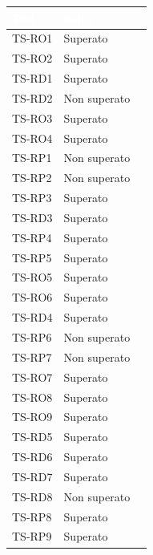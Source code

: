 \begin{longtable}{|>{\centering\arraybackslash}m{1.6cm}|>{\centering\arraybackslash}m{6.41cm}|>{\centering\arraybackslash}m{3.1cm}|}		
	\rowcolor{LightBlue}
	\textbf{\textcolor{white}{Test}}
	& \textbf{\textcolor{white}{Esito}}\\
	\hline
		\rowcolor{LightGray}
		TS-RO1
		& Superato
		\\ \hline
		TS-RO2
		& Superato
		\\ \hline
		\rowcolor{LightGray}
		TS-RD1
		& Superato
		\\ \hline
		TS-RD2
		& Non superato 
		\\ \hline
		\rowcolor{LightGray}
		TS-RO3
		& Superato
		\\ \hline
		TS-RO4		
		& Superato
		\\ \hline
		\rowcolor{LightGray}
		TS-RP1		
		& Non superato	
		\\ \hline
		TS-RP2		
		& Non superato	
		\\ \hline
		\rowcolor{LightGray}
		TS-RP3		
		& Superato
		\\ \hline
		TS-RD3		
		& Superato
		\\ \hline
		\rowcolor{LightGray}
		TS-RP4		
		& Superato
		\\ \hline
		TS-RP5		
		& Superato
		\\ \hline
		\rowcolor{LightGray}
		TS-RO5		
		& Superato
		\\ \hline
		TS-RO6		
		& Superato
		\\ \hline
		\rowcolor{LightGray}
		TS-RD4		
		& Superato
		\\ \hline
		TS-RP6		
		& Non superato
		\\ \hline
		\rowcolor{LightGray}
		TS-RP7		
		& Non superato
		\\ \hline
		TS-RO7
		& Superato
		\\ \hline
		\rowcolor{LightGray}
		TS-RO8		
		& Superato
		\\ \hline
		TS-RO9		
		& Superato
		\\ \hline
		\rowcolor{LightGray}
		TS-RD5
		& Superato
		\\ \hline
		TS-RD6		
		& Superato
		\\ \hline
		\rowcolor{LightGray}
		TS-RD7
		& Superato
		\\ \hline
		TS-RD8		
		& Non superato
		\\ \hline 
		\rowcolor{LightGray}
		TS-RP8		
		& Superato		
		\\ \hline
		TS-RP9		
		& Superato
		\\ \hline

\end{longtable}
